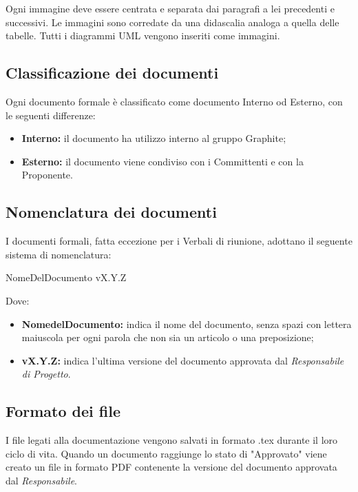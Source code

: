 \documentclass[../NormediProgetto.tex]{subfiles}
\begin{document}
Ogni immagine deve essere centrata e separata dai paragrafi a lei precedenti e successivi. Le immagini sono corredate da una didascalia analoga a quella delle tabelle. Tutti i diagrammi UML vengono inseriti come immagini.

\subsection{Classificazione dei documenti}

Ogni documento formale è classificato come documento Interno od Esterno, con le seguenti differenze:

\begin{itemize}
    \item \textbf{Interno:} il documento ha utilizzo interno al gruppo Graphite;
    \item \textbf{Esterno:} il documento viene condiviso con i Committenti e con la Proponente.
\end{itemize}

\subsection{Nomenclatura dei documenti}

I documenti formali, fatta eccezione per i Verbali di riunione, adottano il seguente sistema di nomenclatura:

\centerline{NomeDelDocumento vX.Y.Z}

Dove:

\begin{itemize}
    \item \textbf{NomedelDocumento:} indica il nome del documento, senza spazi con lettera maiuscola per ogni parola che non sia un articolo o una preposizione;
    
    \item \textbf{vX.Y.Z:}  indica l'ultima versione del documento approvata dal \textit{Responsabile di Progetto}.
\end{itemize}

\subsection{Formato dei file}
I file legati alla documentazione vengono salvati in formato .tex durante il loro ciclo di vita. Quando un documento raggiunge lo stato di "Approvato" viene creato un file in formato PDF contenente la versione del documento approvata dal \textit{Responsabile}.
\end{document}
